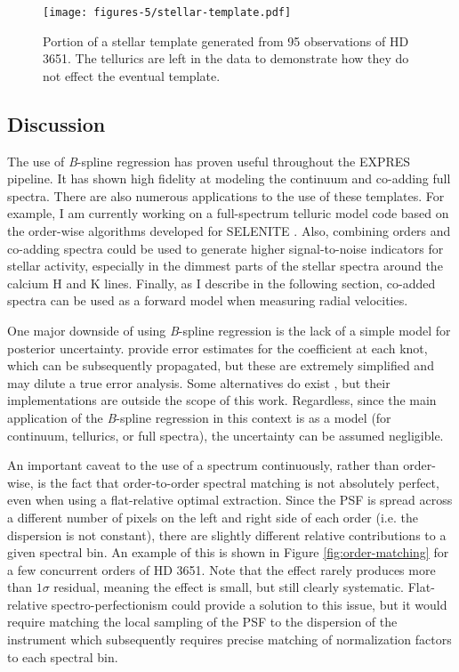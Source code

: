 \begin{figure}
    \centering
    \texttt{[image: figures-5/stellar-template.pdf]}
    \caption[HD 3651 stellar template]{Portion of a stellar template generated from 95 observations of HD 3651. The tellurics are left in the data to demonstrate how they do not effect the eventual template.}
    \label{fig:stellar-template}
\end{figure}

\subsection{Discussion}

The use of \textit{B}-spline regression has proven useful throughout the EXPRES pipeline. It has shown high fidelity at modeling the continuum and co-adding full spectra. There are also numerous applications to the use of these templates. For example, I am currently working on a full-spectrum telluric model code based on the order-wise algorithms developed for SELENITE \citep{leet_toward_2019}. Also, combining orders and co-adding spectra could be used to generate higher signal-to-noise indicators for stellar activity, especially in the dimmest parts of the stellar spectra around the calcium H and K lines. Finally, as I describe in the following section, co-added spectra can be used as a forward model when measuring radial velocities.

One major downside of using \textit{B}-spline regression is the lack of a simple model for posterior uncertainty. \citet{zechmeister_spectrum_2018} provide error estimates for the coefficient at each knot, which can be subsequently propagated, but these are extremely simplified and may dilute a true error analysis. Some alternatives do exist \citep{gardner_uncertainties_2003, enting_propagating_2006}, but their implementations are outside the scope of this work. Regardless, since the main application of the \textit{B}-spline regression in this context is as a model (for continuum, tellurics, or full spectra), the uncertainty can be assumed negligible.

An important caveat to the use of a spectrum continuously, rather than order-wise, is the fact that order-to-order spectral matching is not absolutely perfect, even when using a flat-relative optimal extraction. Since the PSF is spread across a different number of pixels on the left and right side of each order (i.e. the dispersion is not constant), there are slightly different relative contributions to a given spectral bin. An example of this is shown in Figure \ref{fig:order-matching} for a few concurrent orders of HD 3651. Note that the effect rarely produces more than $1\sigma$ residual, meaning the effect is small, but still clearly systematic. Flat-relative spectro-perfectionism could provide a solution to this issue, but it would require matching the local sampling of the PSF to the dispersion of the instrument which subsequently requires precise matching of normalization factors to each spectral bin.

